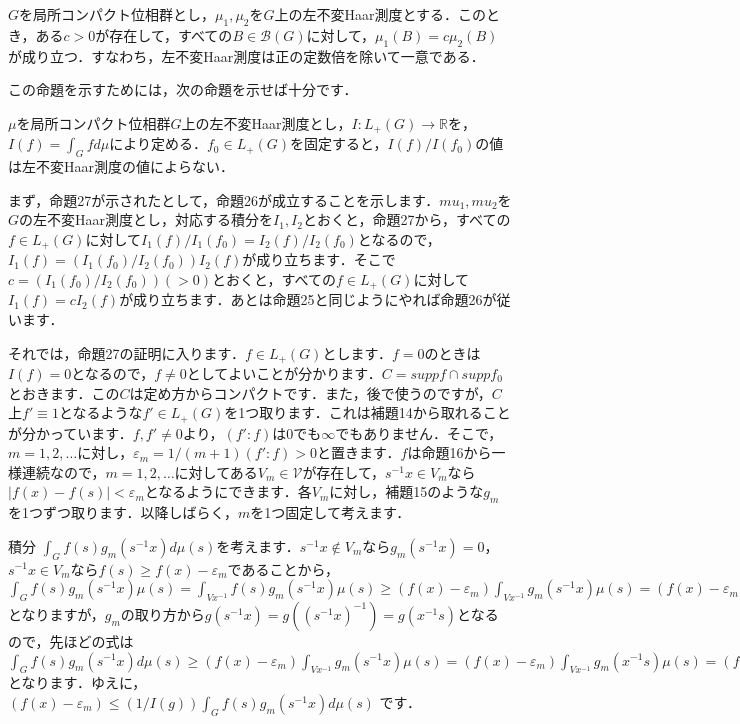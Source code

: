 \begin{prop}
$G$を局所コンパクト位相群とし，$\mu_1, \mu_2$を$G$上の左不変Haar測度とする．このとき，ある$c>0$が存在して，すべての$B \in \mathscr{B}(G)$に対して，$\mu_1(B)=c\mu_2(B)$が成り立つ．すなわち，左不変Haar測度は正の定数倍を除いて一意である．
\end{prop}
この命題を示すためには，次の命題を示せば十分です．
\begin{prop}
$\mu$を局所コンパクト位相群$G$上の左不変Haar測度とし，$I \colon L_{+}(G) \to \mathbb{R}$を，$I(f)=\int_{G}f d\mu$により定める．$f_0 \in L_{+}(G)$を固定すると，$I(f)/I(f_0)$の値は左不変Haar測度の値によらない．
\end{prop}
まず，命題27が示されたとして，命題26が成立することを示します．$mu_1, mu_2$を$G$の左不変Haar測度とし，対応する積分を$I_1, I_2$とおくと，命題27から，すべての$f \in L_{+}(G)$に対して$I_{1}(f)/I_{1}(f_0)=I_{2}(f)/I_{2}(f_0)$となるので，$I_{1}(f)= \left( I_{1}(f_0)/I_{2}(f_{0}) \right) I_{2}(f)$が成り立ちます．そこで$c=\left( I_{1}(f_0)/I_{2}(f_{0}) \right)(>0)$とおくと，すべての$f \in L_{+}(G)$に対して$I_{1}(f)= c I_{2}(f)$が成り立ちます．あとは命題25と同じようにやれば命題26が従います．　\proofend

それでは，命題27の証明に入ります．$f \in L_{+}(G)$とします．$f=0$のときは$I(f)=0$となるので，$f \neq 0$としてよいことが分かります．$C=supp f \cap supp f_{0}$とおきます．この$C$は定め方からコンパクトです．また，後で使うのですが，$C$上$f' \equiv 1$となるような$f' \in L_{
+}(G)$を1つ取ります．これは補題14から取れることが分かっています．$f, f' \neq 0$より，$\left( f' \colon f\right)$は0でも$\infty$でもありません．そこで，$m=1,2,\ldots$に対し，$\varepsilon_{m}=1/(m+1)\left( f' \colon f \right)>0$と置きます．$f$は命題16から一様連続なので，$m=1,2,\ldots$に対してある$V_m \in \mathscr{V}$が存在して，$s^{-1}x \in V_m$なら$|f(x)-f(s)|<\varepsilon _{m}$となるようにできます．各$V_m$に対し，補題15のような$g_m$を1つずつ取ります．以降しばらく，$m$を1つ固定して考えます．

積分 $\int_{G}f(s)g_{m}(s^{-1}x)d\mu(s)$を考えます．$s^{-1}x \not\in V_m$なら$g_{m}(s^{-1}x)=0$，$s^{-1}x \in V_m$なら$f(s) \ge f(x) -\varepsilon_{m}$であることから，$\int_{G}f(s)g_{m}(s^{-1}x)\mu(s)=\int_{Vx^{-1}}f(s)g_{m}(s^{-1}x)\mu(s) \ge (f(x)-\varepsilon_{m})\int_{Vx^{-1}}g_{m}(s^{-1}x)\mu(s)=(f(x)-\varepsilon_{m})\int_{Vx^{-1}}g_{m}(s^{-1}x)\mu(s)$となりますが，$g_{m}$の取り方から$g(s^{-1}x)=g\left( (s^{-1}x)^{-1} \right)=g(x^{-1}s)$となるので，先ほどの式は$\int_{G}f(s)g_{m}(s^{-1}x)d\mu(s) \ge (f(x)-\varepsilon_{m})\int_{Vx^{-1}}g_{m}(s^{-1}x)\mu(s) = (f(x)-\varepsilon_{m})\int_{Vx^{-1}}g_{m}(x^{-1}s)\mu(s)=(f(x)-\varepsilon_{m}) I(g_{m})$ となります．ゆえに，$(f(x)-\varepsilon_{m}) \le \left( 1/I(g) \right)\int_{G}f(s)g_{m}(s^{-1}x)d\mu(s)$ です．

